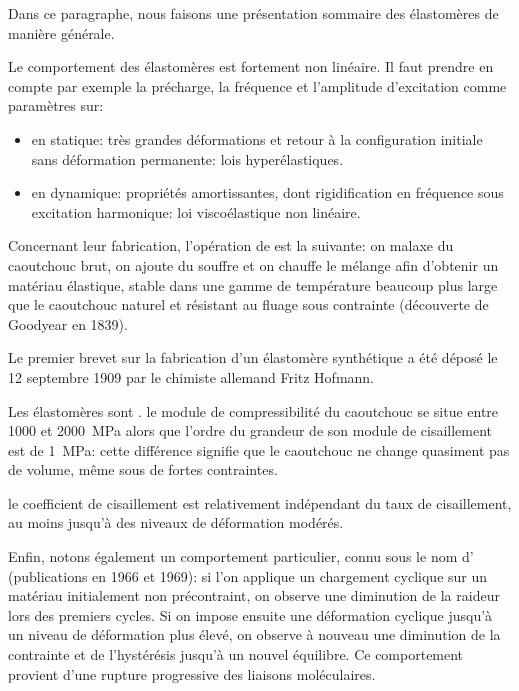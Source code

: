 Dans ce paragraphe, nous faisons une présentation sommaire des élastomères de manière
générale.

\medskip
Le comportement des élastomères est fortement non linéaire. Il faut prendre en compte par exemple la précharge, la fréquence et l'amplitude d'excitation comme paramètres sur:
\begin{itemize}
	\item en statique: très grandes déformations et retour à la configuration
		initiale sans déformation permanente: lois hyperélastiques.
	\item en dynamique: propriétés amortissantes, dont rigidification en fréquence
		sous excitation harmonique: loi viscoélastique non linéaire.
\end{itemize}

\medskip
Concernant leur fabrication, l'opération de  est la suivante: on malaxe du caoutchouc brut, on ajoute du souffre et on chauffe le mélange afin d'obtenir un matériau élastique, stable dans une gamme de température beaucoup plus large que le caoutchouc naturel et résistant au fluage sous contrainte (découverte de Goodyear en 1839).

Le premier brevet sur la fabrication d'un élastomère synthétique a été déposé le 12 septembre 1909 par le chimiste allemand Fritz Hofmann.

\medskip
Les élastomères sont . le module de compressibilité du caoutchouc se situe entre 1000 et 2000~MPa alors que l'ordre du grandeur de son module de cisaillement est de 1~MPa: cette différence signifie que le caoutchouc ne change quasiment pas de volume, même sous de fortes contraintes.

\medskip
{} le coefficient de cisaillement est relativement indépendant du taux de cisaillement, au moins jusqu'à des niveaux de déformation modérés.

\medskip
Enfin, notons également un comportement particulier, connu sous le nom d' (publications en 1966 et 1969): si l'on applique un chargement cyclique sur un matériau initialement non précontraint, on observe une diminution de la raideur lors des premiers cycles. Si on impose ensuite une déformation cyclique jusqu'à un niveau de déformation plus élevé, on observe à nouveau une diminution de la contrainte et de l'hystérésis jusqu'à un nouvel équilibre. Ce comportement provient d'une rupture progressive des liaisons moléculaires.


